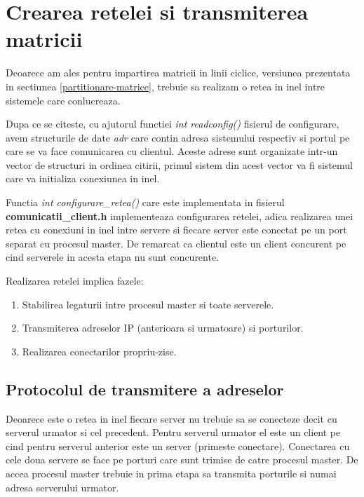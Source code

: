 \section{Crearea retelei si transmiterea matricii}

\hspace{5mm}Deoarece am ales pentru impartirea matricii in linii ciclice, 
versiunea prezentata in sectiunea \ref{partitionare-matrice}, trebuie
 sa realizam o retea in inel intre sistemele care conlucreaza.

Dupa ce se citeste, cu ajutorul functiei {\it int readconfig()} fisierul de
configurare, avem structurile de date {\it adr} care contin adresa sistemului 
respectiv si portul pe care se va face comunicarea cu clientul. Aceste adrese 
sunt organizate intr-un vector de structuri in ordinea citirii, primul sistem 
din acest vector va fi sistemul care va initializa conexiunea in inel.

Functia {\it int configurare\_retea()} care este implementata in fisierul
{\bf comunicatii\_client.h} implementeaza configurarea retelei, adica
realizarea unei retea cu conexiuni in inel intre servere si fiecare server
este conectat pe un port separat cu procesul master. De remarcat ca
clientul este un client concurent pe cind serverele in acesta etapa nu sunt
concurente.

Realizarea retelei implica fazele:
\begin{enumerate}
\item Stabilirea legaturii intre procesul master si toate serverele.
\item Transmiterea adreselor IP (anterioara si urmatoare) si porturilor.
\item Realizarea conectarilor propriu-zise.
\end{enumerate}

\subsection{Protocolul de transmitere a adreselor}

\hspace{5mm}Deoarece este o retea in inel fiecare server nu trebuie sa se
conecteze decit cu serverul urmator si cel precedent. Pentru serverul
urmator el este un client pe cind pentru serverul anterior este un server
(primeste conectare). Conectarea cu cele doua servere se face pe porturi
care sunt trimise de catre procesul master.
De accea procesul master trebuie in prima etapa sa transmita porturile si
numai adresa serverului urmator.

